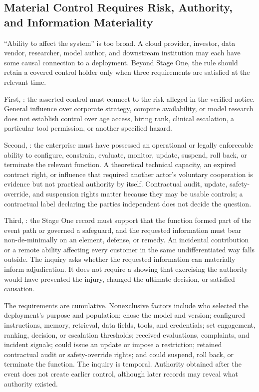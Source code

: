 \subsection{Material Control Requires Risk, Authority, and Information Materiality}
\label{sec:material-control}

``Ability to affect the system'' is too broad. A cloud provider, investor, data vendor, researcher, model author, and downstream institution may each have some causal connection to a deployment. Beyond Stage One, the rule should retain a covered control holder only when three requirements are satisfied at the relevant time.

First, : the asserted control must connect to the risk alleged in the verified notice. General influence over corporate strategy, compute availability, or model research does not establish control over age access, hiring rank, clinical escalation, a particular tool permission, or another specified hazard.

Second, : the enterprise must have possessed an operational or legally enforceable ability to configure, constrain, evaluate, monitor, update, suspend, roll back, or terminate the relevant function. A theoretical technical capacity, an expired contract right, or influence that required another actor's voluntary cooperation is evidence but not practical authority by itself. Contractual audit, update, safety-override, and suspension rights matter because they may be usable controls; a contractual label declaring the parties independent does not decide the question.

Third, : the Stage One record must support that the function formed part of the event path or governed a safeguard, and the requested information must bear non-de-minimally on an element, defense, or remedy. An incidental contribution or a remote ability affecting every customer in the same undifferentiated way falls outside. The inquiry asks whether the requested information can materially inform adjudication. It does not require a showing that exercising the authority would have prevented the injury, changed the ultimate decision, or satisfied causation.

The requirements are cumulative. Nonexclusive factors include who selected the deployment's purpose and population; chose the model and version; configured instructions, memory, retrieval, data fields, tools, and credentials; set engagement, ranking, decision, or escalation thresholds; received evaluations, complaints, and incident signals; could issue an update or impose a restriction; retained contractual audit or safety-override rights; and could suspend, roll back, or terminate the function. The inquiry is temporal. Authority obtained after the event does not create earlier control, although later records may reveal what authority existed.


